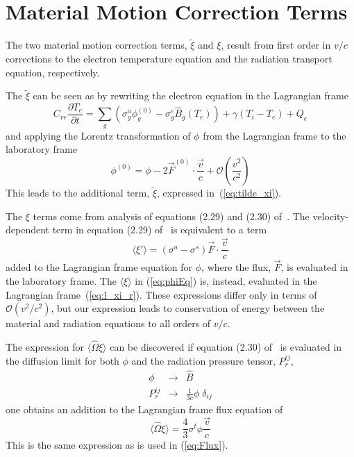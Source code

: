 \documentclass{article}
\newcommand{\partl}[2]{\ensuremath{\frac{\partial{#1}}{\partial{#2}}}}\newcommand{\del}{\ensuremath{\vec{\nabla}}}
\newcommand{\Bg}{\ensuremath{\hat{B}_{g}}}
\begin{document}
\section{Material Motion Correction Terms}

The two material motion correction terms, $\tilde{\xi}$ and $\xi$, result
from first order in $v/c$ corrections to the electron temperature equation
and the radiation transport equation, respectively.

The $\tilde{\xi}$ can be seen as by rewriting the electron equation in
the Lagrangian frame
\begin{equation}
        C_{ve} \partl{T_{e}}{t} = 
                \sum_{g} \left(
                        \sigma_{g}^{a} \phi^{(0)}_{g}
                        - \sigma_{g}^{e} \Bg(T_{e}) \right)
                        + \gamma (T_{i} - T_{e}) + Q_{e}
\end{equation}
and applying the Lorentz transformation of $\phi$ from the Lagrangian frame
to the laboratory frame~\cite[page 417]{MihalasMihalas}
\begin{equation}
        \phi^{(0)} = \phi - 2 \vec{F}^{(0)} \cdot \frac{\vec{v}}{c} 
                 + \mathcal{O}(\frac{v^2}{c^2})
\end{equation}
This leads to the additional term, $\tilde{\xi}$,
expressed in~(\ref{eq:tilde_xi}).

The $\xi$ terms come from analysis of equations (2.29) and (2.30)
of~\cite{MihalasKlein}.
The velocity-dependent term in equation (2.29) of~\cite{MihalasKlein}
is equivalent to a term
\begin{equation}
        \langle \xi' \rangle = (\sigma^{a} - \sigma^{s}) \vec{F}
                        \cdot \frac{\vec{v}}{c}
\end{equation}
added to the Lagrangian frame equation for $\phi$,
where the flux, $\vec{F}$, is evaluated in the laboratory frame.
The $\langle \xi \rangle$ in (\ref{eq:phiEq}) is, instead, evaluated in the
Lagrangian frame~(\ref{eq:l_xi_r}).
These expressions differ only in terms of $\mathcal{O}(v^2/c^2)$,
but our expression
leads to conservation of energy between the material and radiation equations
to all orders of $v/c$.

The expression for $\langle \hat{\Omega} \xi \rangle$ can be discovered
if equation (2.30) of~\cite{MihalasKlein} is evaluated in the diffusion limit
for both $\phi$ and the radiation pressure tensor, $P_{r}^{ij}$,
\begin{eqnarray}
        \phi &\rightarrow& \hat{B} \\
        P_{r}^{ij} &\rightarrow& \frac{1}{3c} \phi \; \delta_{ij} 
\end{eqnarray}
one obtains an addition to the Lagrangian frame flux equation of
\begin{equation}
        \langle \hat{\Omega} \xi \rangle = 
                \frac{4}{3} \sigma^{t} \phi \frac{\vec{v}}{c}
\end{equation}
This is the same expression as is used in (\ref{eq:Flux}).
\end{document}
